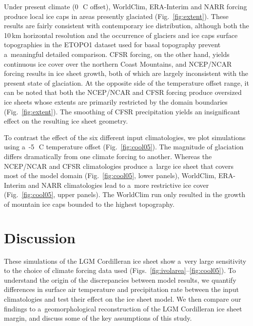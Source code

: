 \documentclass[tc, ms]{copernicus}
\begin{document}
Under present climate (0\,\unit{{\degree}C} offset), WorldClim, ERA-Interim and NARR forcing produce local ice caps in areas presently glaciated (Fig.~\ref{fig:extent}). These results are fairly consistent with contemporary ice distribution, although both the 10\,\unit{km} horizontal resolution and the occurrence of glaciers and ice caps surface topographies in the ETOPO1 dataset used for basal topography prevent a~meaningful detailed comparison. CFSR forcing, on the other hand, yields continuous ice cover over the northern Coast Mountains, and NCEP/NCAR forcing results in ice sheet growth, both of which are largely inconsistent with the present state of glaciation. At the opposite side of the temperature offset range, it can be noted that both the NCEP/NCAR and CFSR forcing produce oversized ice sheets whose extents are primarily restricted by the domain boundaries (Fig.~\ref{fig:extent}). The smoothing of CFSR precipitation yields an insignificant effect on the resulting ice sheet geometry.

To contrast the effect of the six different input climatologies, we plot simulations using a~-5\,\unit{{\degree}C} temperature offset (Fig.~\ref{fig:cool05}). The magnitude of glaciation differs dramatically from one climate forcing to another. Whereas the NCEP/NCAR and CFSR climatologies produce a~large ice sheet that covers most of the model domain (Fig.~\ref{fig:cool05}, lower panels), WorldClim, ERA-Interim and NARR climatologies lead to a~more restrictive ice cover (Fig.~\ref{fig:cool05}, upper panels). The WorldClim run only resulted in the growth of mountain ice caps bounded to the highest topography.

\section{Discussion}
\label{sec:discussion}

These simulations of the LGM Cordilleran ice sheet show a~very large sensitivity to the choice of climate forcing data used (Figs.~\ref{fig:ivolarea}--\ref{fig:cool05}). To understand the origin of the discrepancies between model results, we quantify differences in surface air temperature and precipitation rate between the input climatologies and test their effect on the ice sheet model. We then compare our findings to a~geomorphological reconstruction of the LGM Cordilleran ice sheet margin, and discuss some of the key assumptions of this study.
\end{document}
